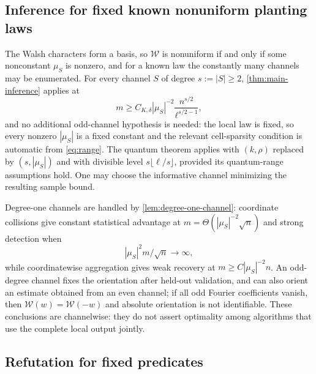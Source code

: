 \documentclass[11pt]{article}
\theoremstyle{definition}
\theoremstyle{remark}
\newcommand{\1}{\mathbf 1}
\newcommand{\cW}{\mathcal W}
\numberwithin{equation}{section}
\begin{document}
\subsection{Inference for fixed known nonuniform planting laws}

The Walsh characters form a basis, so $\cW$ is nonuniform if and only
if some nonconstant $\mu_S$ is nonzero, and for a known law the
constantly many channels may be enumerated.  For every channel $S$ of
degree $s:=|S|\ge2$, \cref{thm:main-inference} applies at
\begin{equation}\label{eq:csp-inference-curve}
 m\ge C_{K,\delta}|\mu_S|^{-2}
       \frac{n^{s/2}}{\ell^{s/2-1}},
\end{equation}
and no additional odd-channel hypothesis is needed: the local law is
fixed, so every nonzero $|\mu_S|$ is a fixed constant and the relevant
cell-sparsity condition is automatic from \cref{eq:range}.  The quantum
theorem applies with $(k,\rho)$ replaced
by $(s,|\mu_S|)$ and with divisible level $s\lfloor\ell/s\rfloor$,
provided its quantum-range assumptions hold.  One may choose the
informative channel minimizing the resulting sample bound.

Degree-one channels are handled by \cref{lem:degree-one-channel}:
coordinate collisions give constant statistical advantage at
$m=\Theta(|\mu_S|^{-2}\sqrt n)$ and strong detection when
\begin{equation}\label{eq:degree-one-strong-detection}
 |\mu_S|^2m/\sqrt n\longrightarrow\infty,
\end{equation}
while coordinatewise aggregation gives weak recovery at
$m\ge C|\mu_S|^{-2}n$.  An odd-degree channel fixes the orientation
after held-out validation, and can also orient an estimate obtained
from an even channel; if all odd Fourier coefficients vanish, then
$\cW(w)=\cW(-w)$ and absolute orientation is not identifiable.  These
conclusions are channelwise: they do not assert optimality among
algorithms that use the complete local output jointly.

\subsection{Refutation for fixed predicates}
\end{document}

